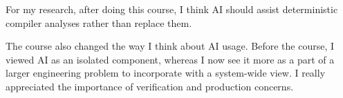 \documentclass[11pt]{article}
\begin{document}
For my research, after doing this course, I think AI should assist deterministic
compiler analyses rather than replace them.

The course also changed the way I think about AI usage. Before the course, I
viewed AI as an isolated component, whereas I now see it more as a part of a
larger engineering problem to incorporate with a system-wide view. I really
appreciated the importance of verification and production concerns.
\end{document}
